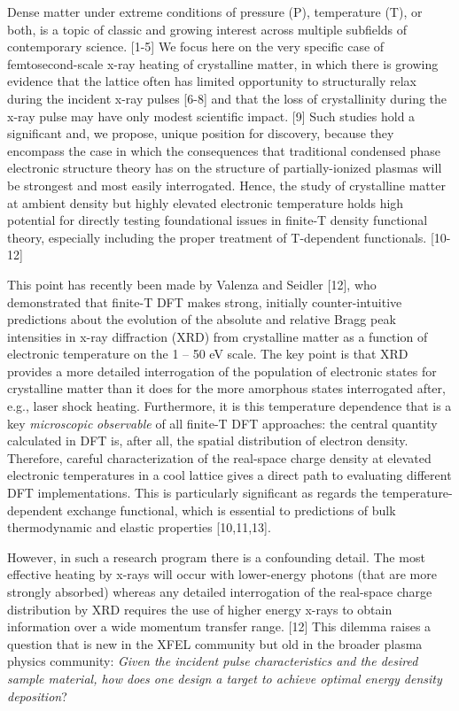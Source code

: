 Dense matter under extreme conditions of pressure (P), temperature (T),
or both, is a topic of classic and growing interest across multiple
subfields of contemporary science. {[}1-5{]} We focus here on the very
specific case of femtosecond-scale x-ray heating of crystalline matter,
in which there is growing evidence that the lattice often has limited
opportunity to structurally relax during the incident x-ray pulses
{[}6-8{]} and that the loss of crystallinity during the x-ray pulse may
have only modest scientific impact. {[}9{]} Such studies hold a
significant and, we propose, unique position for discovery, because they
encompass the case in which the consequences that traditional condensed
phase electronic structure theory has on the structure of
partially-ionized plasmas will be strongest and most easily
interrogated. Hence, the study of crystalline matter at ambient density
but highly elevated electronic temperature holds high potential for
directly testing foundational issues in finite-T density functional
theory, especially including the proper treatment of T-dependent
functionals. {[}10-12{]}

This point has recently been made by Valenza and Seidler {[}12{]}, who
demonstrated that finite-T DFT makes strong, initially counter-intuitive
predictions about the evolution of the absolute and relative Bragg peak
intensities in x-ray diffraction (XRD) from crystalline matter as a
function of electronic temperature on the 1 -- 50 eV scale. The key
point is that XRD provides a more detailed interrogation of the
population of electronic states for crystalline matter than it does for
the more amorphous states interrogated after, e.g., laser shock heating.
Furthermore, it is this temperature dependence that is a key
\emph{microscopic} \emph{observable} of all finite-T DFT approaches: the
central quantity calculated in DFT is, after all, the spatial
distribution of electron density. Therefore, careful characterization of
the real-space charge density at elevated electronic temperatures in a
cool lattice gives a direct path to evaluating different DFT
implementations. This is particularly significant as regards the
temperature-dependent exchange functional, which is essential to
predictions of bulk thermodynamic and elastic properties {[}10,11,13{]}.

However, in such a research program there is a confounding detail. The
most effective heating by x-rays will occur with lower-energy photons
(that are more strongly absorbed) whereas any detailed interrogation of
the real-space charge distribution by XRD requires the use of higher
energy x-rays to obtain information over a wide momentum transfer range.
{[}12{]} This dilemma raises a question that is new in the XFEL
community but old in the broader plasma physics community: \emph{Given
the incident pulse characteristics and the desired sample material, how
does one design a target to achieve optimal energy density deposition}?


